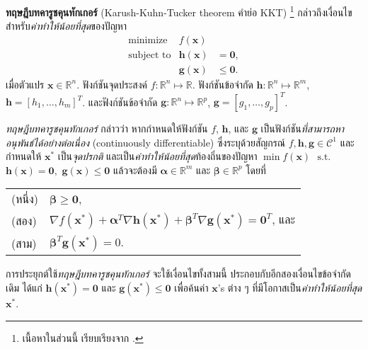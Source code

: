 \begin{Exercise}
	\label{ex: opt kkt}
	
\textbf{ทฤษฎีบทคารูชคุนทักเกอร์} (Karush-Kuhn-Tucker theorem คำย่อ KKT)%
\footnote{%
เนื้อหาในส่วนนี้ เรียบเรียงจาก \cite{ChongZak2ndEd}.
}
กล่าวถึงเงื่อนไขสำหรับ\textit{ค่าทำให้น้อยที่สุด}ของปัญหา
\begin{eqnarray}
\mathrm{minimize} &  f(\bm{x}) &
\nonumber \\
\mbox{subject to} & \bm{h}(\bm{x}) & = \bm{0},
\nonumber \\
                  & \bm{g}(\bm{x}) & \leq \bm{0}.
\nonumber                  
\end{eqnarray}
เมื่อตัวแปร $\bm{x} \in \mathbb{R}^n$.
ฟังก์ชันจุดประสงค์ $f: \mathbb{R}^n \mapsto \mathbb{R}$.
ฟังก์ชันข้อจำกัด $\bm{h}: \mathbb{R}^n \mapsto \mathbb{R}^m$, $\bm{h} = [h_1, \ldots, h_m]^T$.
และฟังก์ชันข้อจำกัด $\bm{g}: \mathbb{R}^n \mapsto \mathbb{R}^p$, $\bm{g} = [g_1, \ldots, g_p]^T$.

\textit{ทฤษฎีบทคารูชคุนทักเกอร์}
กล่าวว่า
หากกำหนดให้ฟังก์ชัน $f$, $\bm{h}$, และ $\bm{g}$ เป็นฟังก์ชัน\textit{ที่สามารถหาอนุพันธ์ได้อย่างต่อเนื่อง} (continuously differentiable) ซึ่งระบุด้วยสัญกรณ์ $f, \bm{h}, \bm{g} \in \mathcal{C}^1$
และกำหนดให้ $\bm{x}^\ast$ เป็น\textit{จุดปรกติ} และเป็น\textit{ค่าทำให้น้อยที่สุด}ท้องถิ่นของปัญหา
$\min f(\bm{x})$ $\mbox{ s.t. }$ $\bm{h}(\bm{x}) = \bm{0},$ $\bm{g}(\bm{x}) \leq \bm{0}$
แล้วจะต้องมี $\bm{\alpha} \in \mathbb{R}^m$ และ $\bm{\beta} \in \mathbb{R}^p$ โดยที่
\\
\begin{tabular}{ll}
(หนึ่ง) & $\bm{\beta} \geq \bm{0}$, \\
(สอง) & $\nabla f(\bm{x}^\ast) + \bm{\alpha}^{T} \nabla \bm{h}(\bm{x}^\ast) + \bm{\beta}^{T} \nabla \bm{g}(\bm{x}^\ast) = \bm{0}^T$, และ \\
(สาม) & $\bm{\beta}^{T} \bm{g}(\bm{x}^\ast) = 0$.
\end{tabular} 

การประยุกต์ใช้\textit{ทฤษฎีบทคารูชคุนทักเกอร์} จะใช้เงื่อนไขทั้งสามนี้ ประกอบกับอีกสองเงื่อนไขข้อจำกัดเดิม ได้แก่ $\bm{h}(\bm{x}^\ast) = \bm{0}$ และ $\bm{g}(\bm{x}^\ast) \leq \bm{0}$
เพื่อค้นค่า $\bm{x}$'s ต่าง ๆ ที่มีโอกาสเป็น\textit{ค่าทำให้น้อยที่สุด} $\bm{x}^\ast$.



\end{Exercise}
